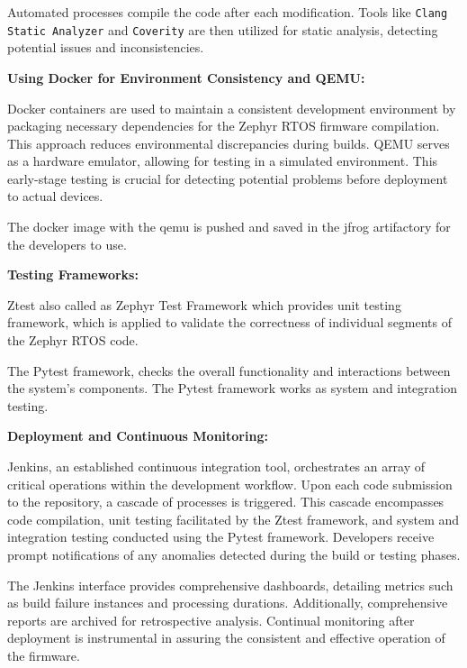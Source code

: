 Automated processes compile the code after each modification. Tools like
\texttt{Clang Static Analyzer}\cite{kremenek2008finding} and \texttt{Coverity}\cite{imtiaz2019developers}
are then utilized for static analysis, detecting potential issues and inconsistencies.

\textbf{Using Docker\cite{anderson2015docker} for Environment Consistency and QEMU:}

Docker\cite{anderson2015docker} containers are used to maintain a consistent development environment
by packaging necessary dependencies for the Zephyr RTOS firmware compilation.
This approach reduces environmental discrepancies during builds.
\gls{QEMU}\cite{bellard2005qemu} serves as a hardware emulator, allowing for testing in a simulated
environment. This early-stage testing is crucial for detecting potential problems
before deployment to actual devices.

The docker image\cite{bui2015analysis} with the \acrshort{qemu} is pushed and saved in the
jfrog artifactory\cite{Artifact8:online} for the developers to use.

\textbf{Testing Frameworks:}

Ztest also called as Zephyr Test Framework which provides unit testing framework, which is applied to
validate the correctness of individual segments of the Zephyr RTOS code\cite{TestFram11:online}.

The Pytest\cite{hunt2019pytest} framework, checks the overall functionality and
interactions between the system's components. The Pytest framework works as system and
integration testing.

\textbf{Deployment and Continuous Monitoring:}

Jenkins, an established continuous integration tool\cite{smart2011jenkins}, orchestrates
an array of critical operations within the development workflow\cite{sayfan2017mastering}.
Upon each code submission to the repository, a cascade of processes is triggered.
This cascade encompasses code compilation, unit testing facilitated by the Ztest framework,
and system and integration testing conducted using the Pytest framework. Developers receive
prompt notifications of any anomalies detected during the build or testing phases.

The Jenkins interface provides comprehensive dashboards, detailing metrics such as
build failure instances and processing durations. Additionally, comprehensive reports are
archived for retrospective analysis. Continual monitoring after deployment is instrumental in
assuring the consistent and effective operation of the firmware.

